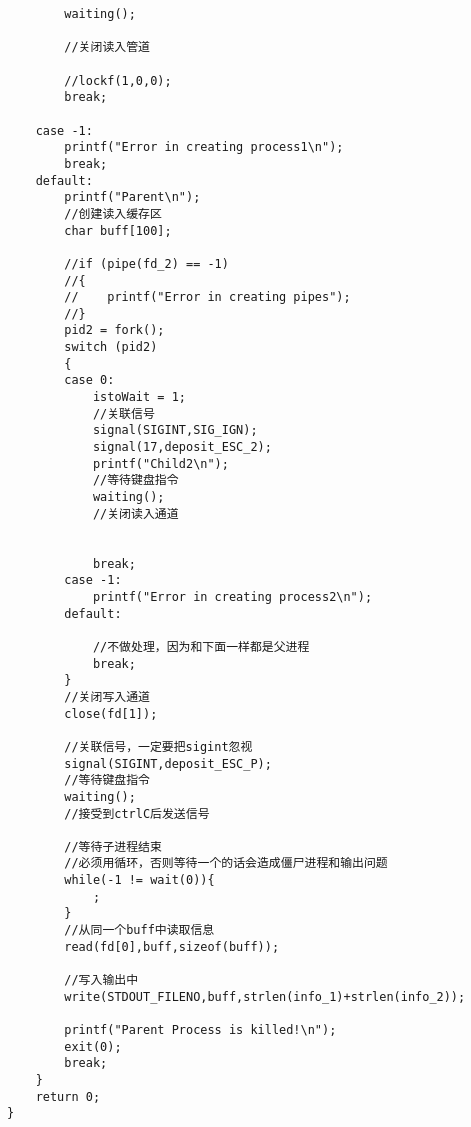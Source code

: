 \documentclass[UTF8]{ctexart}
\begin{document}
\begin{lstlisting}
        waiting();

        //关闭读入管道
        
        //lockf(1,0,0);
        break;
        
    case -1:
        printf("Error in creating process1\n");
        break;
    default:
        printf("Parent\n");
        //创建读入缓存区
        char buff[100];
        
        //if (pipe(fd_2) == -1)
        //{
        //    printf("Error in creating pipes");
        //}
        pid2 = fork();
        switch (pid2)
        {
        case 0:
            istoWait = 1;
            //关联信号
            signal(SIGINT,SIG_IGN);
            signal(17,deposit_ESC_2);
            printf("Child2\n");
            //等待键盘指令
            waiting();
            //关闭读入通道
            
            
            break;
        case -1:
            printf("Error in creating process2\n");
        default:
            
            //不做处理，因为和下面一样都是父进程
            break;
        }
        //关闭写入通道
        close(fd[1]);
        
        //关联信号，一定要把sigint忽视
        signal(SIGINT,deposit_ESC_P);
        //等待键盘指令
        waiting();
        //接受到ctrlC后发送信号
        
        //等待子进程结束
        //必须用循环，否则等待一个的话会造成僵尸进程和输出问题
        while(-1 != wait(0)){
            ;
        }
        //从同一个buff中读取信息
        read(fd[0],buff,sizeof(buff));
    
        //写入输出中
        write(STDOUT_FILENO,buff,strlen(info_1)+strlen(info_2));

        printf("Parent Process is killed!\n");
        exit(0);
        break;
    }
    return 0;
}
\end{lstlisting}
\end{document}
